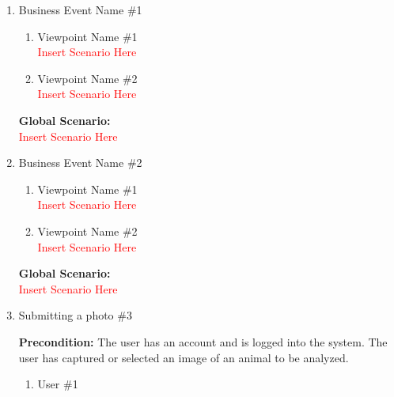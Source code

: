 \documentclass[]{article}
\begin{document}


\begin{enumerate}[{\bf BE1.}]
	\item Business Event Name \#1
		\begin{enumerate}[{\bf VP1.}]
			\item Viewpoint Name \#1 \\
				\textcolor{red}{Insert Scenario Here}
			\item Viewpoint Name \#2 \\
				\textcolor{red}{Insert Scenario Here}
		\end{enumerate}
		{\bf Global Scenario:}\\
		\textcolor{red}{Insert Scenario Here}
	\item Business Event Name \#2
	\begin{enumerate}[{\bf VP1.}]
		\item Viewpoint Name \#1 \\
		\textcolor{red}{Insert Scenario Here}
		\item Viewpoint Name \#2 \\
		\textcolor{red}{Insert Scenario Here}
	\end{enumerate}
	{\bf Global Scenario:}\\
	\textcolor{red}{Insert Scenario Here}

    \item Submitting a photo \#3

    \textbf{Precondition:} The user has an account and is logged into the system. The user has captured or selected an image of an animal to be analyzed.

	\begin{enumerate}[{\bf VP1.}]
		\item User \#1 \\
		

\end{enumerate}
\end{enumerate}
\end{document}
